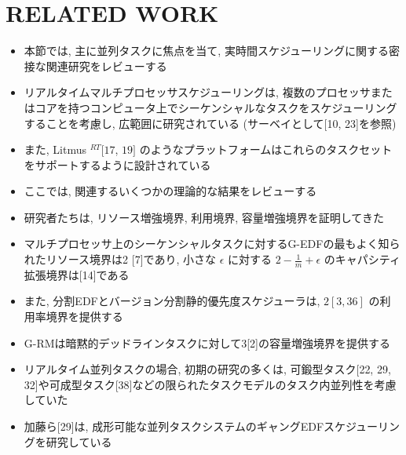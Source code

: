 
\section{RELATED WORK}
\label{sec: Related Work}

\begin{frame}{}
    \begin{itemize}
        \item 本節では, 主に並列タスクに焦点を当て, 実時間スケジューリングに関する密接な関連研究をレビューする
    \end{itemize}
\end{frame}

\begin{frame}{}
    \begin{itemize}
        \item リアルタイムマルチプロセッサスケジューリングは, 複数のプロセッサまたはコアを持つコンピュータ上でシーケンシャルなタスクをスケジューリングすることを考慮し, 広範囲に研究されている (サーベイとして[10, 23]を参照)
\item また, Litmus $^{R T}[17$, $19]$ のようなプラットフォームはこれらのタスクセットをサポートするように設計されている
    \end{itemize}
\end{frame}

\begin{frame}{}
    \begin{itemize}
        \item ここでは, 関連するいくつかの理論的な結果をレビューする
\item 研究者たちは, リソース増強境界, 利用境界, 容量増強境界を証明してきた
\item マルチプロセッサ上のシーケンシャルタスクに対するG-EDFの最もよく知られたリソース境界は2 [7]であり, 小さな $\epsilon$ に対する $2-\frac{1}{m}+\epsilon$ のキャパシティ拡張境界は[14]である
\item また, 分割EDFとバージョン分割静的優先度スケジューラは, $2[3,36]$ の利用率境界を提供する
\item G-RMは暗黙的デッドラインタスクに対して3[2]の容量増強境界を提供する
    \end{itemize}
\end{frame}

\begin{frame}{}
    \begin{itemize}
        \item リアルタイム並列タスクの場合, 初期の研究の多くは, 可鍛型タスク[22, 29, 32]や可成型タスク[38]などの限られたタスクモデルのタスク内並列性を考慮していた
\item 加藤ら[29]は, 成形可能な並列タスクシステムのギャングEDFスケジューリングを研究している
    \end{itemize}
\end{frame}

